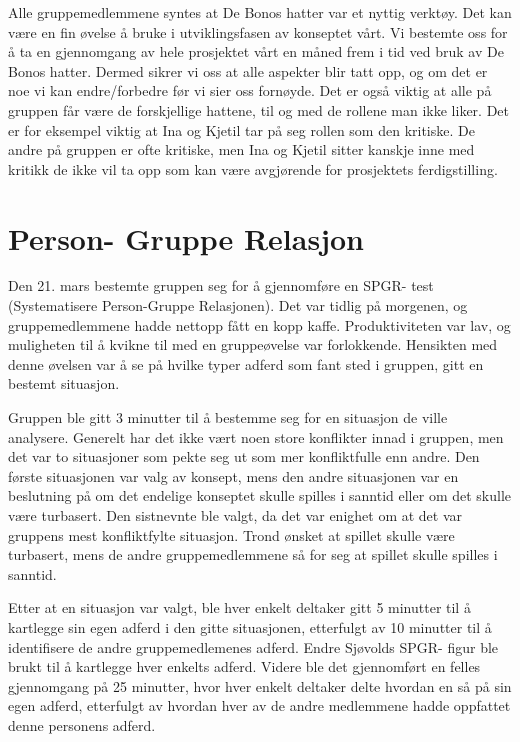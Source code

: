 Alle gruppemedlemmene syntes at De Bonos hatter var et nyttig verktøy. Det kan være en fin øvelse å bruke i utviklingsfasen av konseptet vårt. Vi bestemte oss for å ta en gjennomgang av hele prosjektet vårt en måned frem i tid ved bruk av De Bonos hatter. Dermed sikrer vi oss at alle aspekter blir tatt opp, og om det er noe vi kan endre/forbedre før vi sier oss fornøyde. Det er også viktig at alle på gruppen får være de forskjellige hattene, til og med de rollene man ikke liker. Det er for eksempel viktig at Ina og Kjetil tar på seg rollen som den kritiske. De andre på gruppen er ofte kritiske, men Ina og Kjetil sitter kanskje inne med kritikk de ikke vil ta opp som kan være avgjørende for prosjektets ferdigstilling. 



\section{Person- Gruppe Relasjon} %
Den 21. mars bestemte gruppen seg for å gjennomføre en SPGR- test (Systematisere Person-Gruppe Relasjonen). Det var tidlig på morgenen, og gruppemedlemmene hadde nettopp fått en kopp kaffe. Produktiviteten var lav, og muligheten til å kvikne til med en gruppeøvelse var forlokkende. Hensikten med denne øvelsen var å se på hvilke typer adferd som fant sted i gruppen, gitt en bestemt situasjon. 

Gruppen ble gitt 3 minutter til å bestemme seg for en situasjon de ville analysere. Generelt har det ikke vært noen store konflikter innad i gruppen, men det var to situasjoner som pekte seg ut som mer konfliktfulle enn andre. Den første situasjonen var valg av konsept, mens den andre situasjonen var en beslutning på om det endelige konseptet skulle spilles i sanntid eller om det skulle være turbasert. Den sistnevnte ble valgt, da det var enighet om at det var gruppens mest konfliktfylte situasjon. Trond ønsket at spillet skulle være turbasert, mens de andre gruppemedlemmene så for seg at spillet skulle spilles i sanntid. 

Etter at en situasjon var valgt, ble hver enkelt deltaker gitt 5 minutter til å kartlegge sin egen adferd i den gitte situasjonen, etterfulgt av 10 minutter til å identifisere de andre gruppemedlemenes adferd. Endre Sjøvolds SPGR- figur ble brukt til å kartlegge hver enkelts adferd. Videre ble det gjennomført en felles gjennomgang på 25 minutter, hvor hver enkelt deltaker delte hvordan en så på sin egen adferd, etterfulgt av hvordan hver av de andre medlemmene hadde oppfattet denne personens adferd. 

